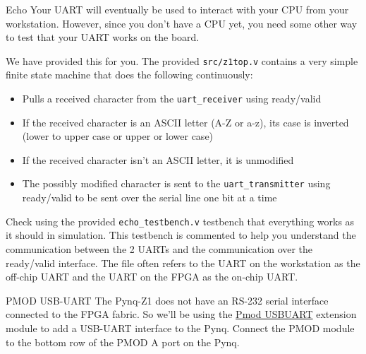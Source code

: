 \documentclass[11pt]{article}
\makeatletter
\renewcommand{\section}
{\@startsection {section}{1}{0pt}
 {-2ex}
 {1ex}
 {\bfseries\Large}}
\renewcommand{\subsection}
{\@startsection {subsection}{1}{0pt}
 {-1ex}
 {0.5ex}
 {\bfseries\normalsize}}
\makeatother
\begin{document}
\section{Echo}
Your UART will eventually be used to interact with your CPU from your workstation.
However, since you don't have a CPU yet, you need some other way to test that your UART works on the board.

We have provided this for you. The provided \verb|src/z1top.v| contains a very simple finite state machine that does the following continuously:

\begin{itemize}
  \item Pulls a received character from the \verb|uart_receiver| using ready/valid
  \item If the received character is an ASCII letter (A-Z or a-z), its case is inverted (lower to upper case or upper or lower case)
  \item If the received character isn't an ASCII letter, it is unmodified
  \item The possibly modified character is sent to the \verb|uart_transmitter| using ready/valid to be sent over the serial line one bit at a time
\end{itemize}

Check using the provided \verb|echo_testbench.v| testbench that everything works as it should in simulation.
This testbench is commented to help you understand the communication between the 2 UARTs and the communication over the ready/valid interface.
The file often refers to the UART on the workstation as the off-chip UART and the UART on the FPGA as the on-chip UART.

\subsection{PMOD USB-UART}
The Pynq-Z1 does not have an RS-232 serial interface connected to the FPGA fabric.
So we'll be using the \href{https://store.digilentinc.com/pmod-usbuart-usb-to-uart-interface/}{Pmod USBUART} extension module to add a USB-UART interface to the Pynq.
Connect the PMOD module to the bottom row of the PMOD A port on the Pynq.

\end{document}
